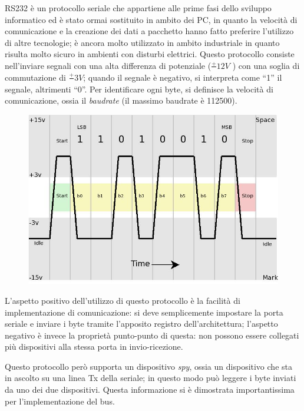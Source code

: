 \documentclass[a4paper,titlepage]{book}
\begin{document}
RS232 è un protocollo seriale che appartiene alle prime fasi dello sviluppo informatico ed è stato ormai sostituito in ambito dei PC, in quanto la velocità di comunicazione e la creazione dei dati a pacchetto hanno fatto preferire l'utilizzo di altre tecnologie; è ancora molto utilizzato in ambito industriale in quanto risulta molto sicuro in ambienti con disturbi elettrici. Questo protocollo consiste nell'inviare segnali con una alta differenza di potenziale ($ \frac{+}{}12V $ ) con una soglia di commutazione di $\frac{+}{} 3V $; quando il segnale è negativo, si interpreta come ``1'' il segnale, altrimenti ``0''. Per identificare ogni byte, si definisce la velocità di comunicazione, ossia il \textit{baudrate} (il massimo baudrate è 112500).

\begin{figure}[!h]
\centering
\includegraphics[scale=0.35]{rs232.jpg}
\end{figure}

L'aspetto positivo dell'utilizzo di questo protocollo è la facilità di implementazione di comunicazione: si deve semplicemente impostare la porta seriale e inviare i byte tramite l'apposito registro dell'architettura; l'aspetto negativo è invece la proprietà punto-punto di questa: non possono essere collegati più dispositivi alla stessa porta in invio-ricezione.

Questo protocollo però supporta un dispositivo \textit{spy}, ossia un dispositivo che sta in ascolto su una linea Tx della seriale; in questo modo può leggere i byte inviati da uno dei due dispositivi. Questa informazione si è dimostrata importantissima per l'implementazione del bus.

~
\end{document}
